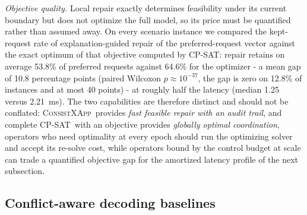 \documentclass[pdflatex,sn-mathphys-num,iicol,oneside]{sn-jnl}
\newcommand{\method}{\textsc{ConsistXApp}}
\newcommand{\cpsat}{\textsc{CP-SAT}}
\begin{document}
\emph{Objective quality.} Local repair exactly determines feasibility
under its current boundary but does not optimize the full model, so
its price must be quantified
rather than assumed away. On every scenario instance we compared the
kept-request rate of explanation-guided repair of the
preferred-request vector against the exact optimum of that objective
computed by \cpsat: repair retains on average 53.8\% of preferred
requests against 64.6\% for the optimizer - a mean gap of 10.8
percentage points (paired Wilcoxon $p\approx10^{-37}$, the gap is zero
on 12.8\% of instances and at most 40 points) - at roughly half the
latency (median 1.25 versus 2.21~ms). The two capabilities are
therefore distinct and should not be conflated: \method\ provides
\emph{fast feasible repair with an audit trail}, and complete \cpsat\
with an objective provides \emph{globally optimal coordination},
operators who need optimality at every epoch should run the optimizing
solver and accept its re-solve cost, while operators bound by the
control budget at scale can trade a quantified objective gap for the
amortized latency profile of the next subsection.

\subsection{Conflict-aware decoding baselines}
\label{sec:decoder-baselines}
\end{document}
